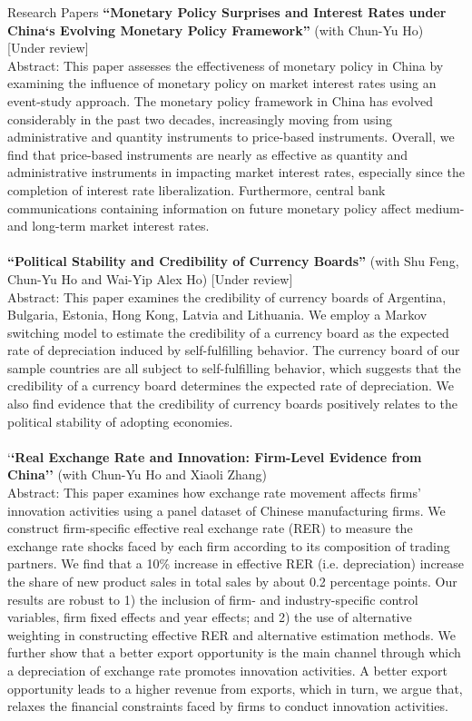 \documentclass{resume_liang} %
\begin{document}
\begin{rSection}{Research Papers}
\textbf{``Monetary Policy Surprises and Interest Rates under China‘s Evolving Monetary Policy Framework''} (with Chun-Yu Ho) [Under review]\\
Abstract: This paper assesses the effectiveness of monetary policy in China by examining the influence of monetary policy on market interest rates using an event-study approach. The monetary policy framework in China has evolved considerably in the past two decades, increasingly moving from using administrative and quantity instruments to price-based instruments. Overall, we find that price-based instruments are nearly as effective as quantity and administrative instruments in impacting market interest rates, especially since the completion of interest rate liberalization. Furthermore, central bank communications containing information on future monetary policy affect medium- and long-term market interest rates.  
\\
\\
\textbf{``Political Stability and Credibility of Currency Boards''} (with Shu Feng, Chun-Yu Ho and Wai-Yip Alex Ho) [Under review] \\
Abstract: This paper examines the credibility of currency boards of Argentina, Bulgaria, Estonia, Hong Kong, Latvia and Lithuania. We employ a Markov switching model to estimate the credibility of a currency board as the expected rate of depreciation induced by self-fulfilling behavior. The currency board of our sample countries are all subject to self-fulfilling behavior, which suggests that the credibility of a currency board determines the expected rate of depreciation. We also find evidence that the credibility of currency boards positively relates to the political stability of adopting economies.
\\
\\
`\textbf{`Real Exchange Rate and Innovation: Firm-Level Evidence from China''} (with Chun-Yu Ho and Xiaoli Zhang) \\
Abstract: This paper examines how exchange rate movement affects firms' innovation activities using a panel dataset of Chinese manufacturing firms. We construct firm-specific effective real exchange rate (RER) to measure the exchange rate shocks faced by each firm according to its composition of trading partners. We find that a 10\% increase in effective RER (i.e. depreciation) increase the share of new product sales in total sales by about 0.2 percentage points. Our results are robust to 1) the inclusion of firm- and industry-specific control variables, firm fixed effects and year effects; and 2) the use of alternative weighting in constructing effective RER and alternative estimation methods. We further show that a better export opportunity is the main channel through which a depreciation of exchange rate promotes innovation activities. A better export opportunity leads to a higher revenue from exports, which in turn, we argue that, relaxes the financial constraints faced by firms to conduct innovation activities.

\end{rSection}
\end{document}
